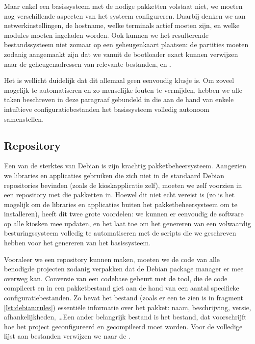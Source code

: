 Maar enkel een basissysteem met de nodige pakketten volstaat niet, we moeten nog verschillende aspecten van het systeem configureren. Daarbij denken we aan netwerkinstellingen, de hostname, welke terminals actief moeten zijn, en welke modules moeten ingeladen worden. Ook kunnen we het resulterende bestandssysteem niet zomaar op een geheugenkaart plaatsen: de partities moeten zodanig aangemaakt zijn dat we vanuit de bootloader exact kunnen verwijzen naar de geheugenadressen van relevante bestanden,  en .

Het is wellicht duidelijk dat dit allemaal geen eenvoudig klusje is. Om zoveel mogelijk te automatiseren en zo menselijke fouten te vermijden, hebben we alle taken beschreven in deze paragraaf gebundeld in  die aan de hand van enkele intuïtieve configuratiebestanden het basissysteem volledig autonoom samenstellen.

\subsection{Repository}
\label{kiosk:deployment:besturingssysteem:repository}

Een van de sterktes van Debian is zijn krachtig pakketbeheersysteem. Aangezien we libraries en applicaties gebruiken die zich niet in de standaard Debian repositories bevinden (zoals de kioskapplicatie zelf), moeten we zelf voorzien in een repository met die pakketten in. Hoewel dit niet echt vereist is (zo is het mogelijk om de libraries en applicaties buiten het pakketbeheersysteem om te installeren), heeft dit twee grote voordelen: we kunnen er eenvoudig de software op alle kiosken mee updaten, en het laat toe om het genereren van een volwaardig besturingssysteem volledig te automatiseren met de scripts die we geschreven hebben voor het genereren van het basissysteem.

Vooraleer we een repository kunnen maken, moeten we de code van alle benodigde projecten zodanig verpakken dat de Debian package manager er mee overweg kan. Conversie van een codebase gebeurt met de  tool, die de code compileert en in een pakketbestand giet aan de hand van een aantal specifieke configuratiebestanden. Zo bevat het  bestand (zoals er een te zien is in fragment \ref{lst:debian:rules}) essentiële informatie over het pakket: naam, beschrijving, versie, afhankelijkheden, \ldots Een ander belangrijk bestand is het  bestand, dat voorschrijft hoe het project geconfigureerd en gecompileerd moet worden. Voor de volledige lijst aan bestanden verwijzen we naar de .

